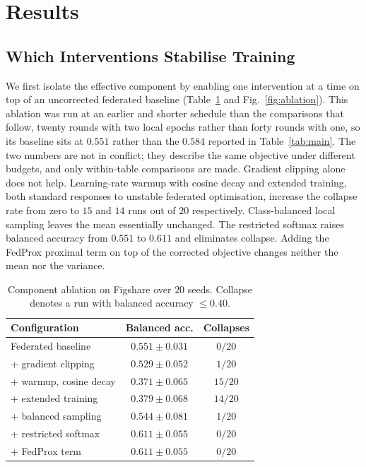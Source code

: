 \documentclass[journal]{IEEEtran}
\begin{document}
\section{Results}
\label{sec:results}

\subsection{Which Interventions Stabilise Training}
We first isolate the effective component by enabling one intervention at a time
on top of an uncorrected federated baseline (Table~\ref{tab:ablation} and
Fig.~\ref{fig:ablation}). This ablation was run at an earlier and shorter
schedule than the comparisons that follow, twenty rounds with two local epochs
rather than forty rounds with one, so its baseline sits at $0.551$ rather than
the $0.584$ reported in Table~\ref{tab:main}. The two numbers are not in
conflict; they describe the same objective under different budgets, and only
within-table comparisons are made. Gradient
clipping alone does not help. Learning-rate warmup with cosine decay and
extended training, both standard responses to unstable federated optimisation,
increase the collapse rate from zero to $15$ and $14$ runs out of $20$
respectively. Class-balanced local sampling leaves the mean essentially
unchanged. The restricted softmax raises balanced accuracy from $0.551$ to
$0.611$ and eliminates collapse. Adding the FedProx proximal term on top of the
corrected objective changes neither the mean nor the variance.

\begin{table}[t]
\centering
\caption{Component ablation on Figshare over $20$ seeds. Collapse denotes a run
with balanced accuracy $\leq 0.40$.}
\label{tab:ablation}
\begin{tabular}{lcc}
\toprule
Configuration & Balanced acc. & Collapses \\
\midrule
Federated baseline            & $0.551 \pm 0.031$ & $0/20$ \\
\quad + gradient clipping     & $0.529 \pm 0.052$ & $1/20$ \\
\quad + warmup, cosine decay  & $0.371 \pm 0.065$ & $15/20$ \\
\quad + extended training     & $0.379 \pm 0.068$ & $14/20$ \\
\quad + balanced sampling     & $0.544 \pm 0.081$ & $1/20$ \\
\quad + restricted softmax    & $\mathbf{0.611 \pm 0.055}$ & $0/20$ \\
\quad + FedProx term          & $0.611 \pm 0.055$ & $0/20$ \\
\bottomrule
\end{tabular}
\end{table}
\end{document}
